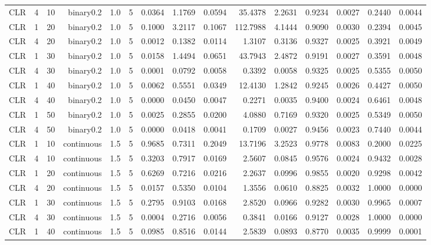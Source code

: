 \begin{longtable}{rrrrrrrrrrrrrrr}
  CLR & 4 & 10 & binary0.2 & 1.0 & 5 & 0.0364 & 1.1769 & 0.0594 & 35.4378 & 2.2631 & 0.9234 & 0.0027 & 0.2440 & 0.0044 \\ 
  CLR & 1 & 20 & binary0.2 & 1.0 & 5 & 0.1000 & 3.2117 & 0.1067 & 112.7988 & 4.1444 & 0.9090 & 0.0030 & 0.2394 & 0.0045 \\ 
  CLR & 4 & 20 & binary0.2 & 1.0 & 5 & 0.0012 & 0.1382 & 0.0114 & 1.3107 & 0.3136 & 0.9327 & 0.0025 & 0.3921 & 0.0049 \\ 
  CLR & 1 & 30 & binary0.2 & 1.0 & 5 & 0.0158 & 1.4494 & 0.0651 & 43.7943 & 2.4872 & 0.9191 & 0.0027 & 0.3591 & 0.0048 \\ 
  CLR & 4 & 30 & binary0.2 & 1.0 & 5 & 0.0001 & 0.0792 & 0.0058 & 0.3392 & 0.0058 & 0.9325 & 0.0025 & 0.5355 & 0.0050 \\ 
  CLR & 1 & 40 & binary0.2 & 1.0 & 5 & 0.0062 & 0.5551 & 0.0349 & 12.4130 & 1.2842 & 0.9245 & 0.0026 & 0.4427 & 0.0050 \\ 
  CLR & 4 & 40 & binary0.2 & 1.0 & 5 & 0.0000 & 0.0450 & 0.0047 & 0.2271 & 0.0035 & 0.9400 & 0.0024 & 0.6461 & 0.0048 \\ 
  CLR & 1 & 50 & binary0.2 & 1.0 & 5 & 0.0025 & 0.2855 & 0.0200 & 4.0880 & 0.7169 & 0.9320 & 0.0025 & 0.5349 & 0.0050 \\ 
  CLR & 4 & 50 & binary0.2 & 1.0 & 5 & 0.0000 & 0.0418 & 0.0041 & 0.1709 & 0.0027 & 0.9456 & 0.0023 & 0.7440 & 0.0044 \\ 
  CLR & 1 & 10 & continuous & 1.5 & 5 & 0.9685 & 0.7311 & 0.2049 & 13.7196 & 3.2523 & 0.9778 & 0.0083 & 0.2000 & 0.0225 \\ 
  CLR & 4 & 10 & continuous & 1.5 & 5 & 0.3203 & 0.7917 & 0.0169 & 2.5607 & 0.0845 & 0.9576 & 0.0024 & 0.9432 & 0.0028 \\ 
  CLR & 1 & 20 & continuous & 1.5 & 5 & 0.6269 & 0.7216 & 0.0216 & 2.2637 & 0.0996 & 0.9855 & 0.0020 & 0.9298 & 0.0042 \\ 
  CLR & 4 & 20 & continuous & 1.5 & 5 & 0.0157 & 0.5350 & 0.0104 & 1.3556 & 0.0610 & 0.8825 & 0.0032 & 1.0000 & 0.0000 \\ 
  CLR & 1 & 30 & continuous & 1.5 & 5 & 0.2795 & 0.9103 & 0.0168 & 2.8520 & 0.0966 & 0.9282 & 0.0030 & 0.9965 & 0.0007 \\ 
  CLR & 4 & 30 & continuous & 1.5 & 5 & 0.0004 & 0.2716 & 0.0056 & 0.3841 & 0.0166 & 0.9127 & 0.0028 & 1.0000 & 0.0000 \\ 
  CLR & 1 & 40 & continuous & 1.5 & 5 & 0.0985 & 0.8516 & 0.0144 & 2.5839 & 0.0893 & 0.8770 & 0.0035 & 0.9999 & 0.0001 \\ 

\end{longtable}
